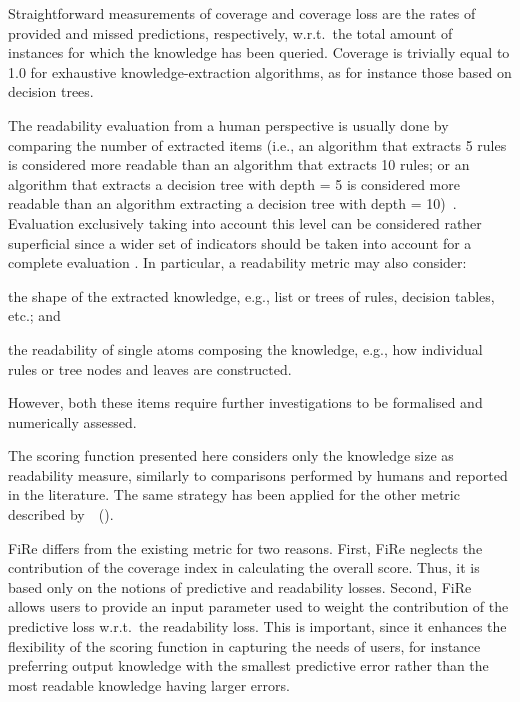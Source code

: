 \documentclass{article}
\newcommand{\citet}[1]{\citeauthor{#1}~(\citeyear{#1})}
\newcommand{\fire}{FiRe}
\newenvironment{inlinelist}{\begin{enumerate*}[label=\emph{(\roman{*})}]}{\end{enumerate*}}
\begin{document}
Straightforward measurements of coverage and coverage loss are the rates of provided and missed predictions, respectively, w.r.t.\ the total amount of instances for which the knowledge has been queried.
%
Coverage is trivially equal to 1.0 for exhaustive knowledge-extraction algorithms, as for instance those based on decision trees.

The readability evaluation from a human perspective is usually done by comparing the number of extracted items (i.e., an algorithm that extracts 5 rules is considered more readable than an algorithm that extracts 10 rules; or an algorithm that extracts a decision tree with depth = 5 is considered more readable than an algorithm extracting a decision tree with depth = 10)~\cite{czarnowski2016}.
% 
Evaluation exclusively taking into account this level can be considered rather superficial since a wider set of indicators should be taken into account for a complete evaluation \cite{sabbatini2022-metrics}.
%
In particular, a readability metric may also consider:
%
\begin{inlinelist}
	\item the shape of the extracted knowledge, e.g., list or trees of rules, decision tables, etc.; and
	\item the readability of single atoms composing the knowledge, e.g., how individual rules or tree nodes and leaves are constructed.
\end{inlinelist}
%
However, both these items require further investigations to be formalised and numerically assessed.

The scoring function presented here considers only the knowledge size as readability measure, similarly to comparisons performed by humans and reported in the literature.
%
The same strategy has been applied for the other metric described by~\citet{skemetrics-aaai2023}.

\fire{} differs from the existing metric for two reasons.
%
First, \fire{} neglects the contribution of the coverage index in calculating the overall score.
%
Thus, it is based only on the notions of predictive and readability losses.
%
Second, \fire{} allows users to provide an input parameter used to weight the contribution of the predictive loss w.r.t.\ the readability loss.
%
This is important, since it enhances the flexibility of the scoring function in capturing the needs of users, for instance preferring output knowledge with the smallest predictive error rather than the most readable knowledge having larger errors.
\end{document}

